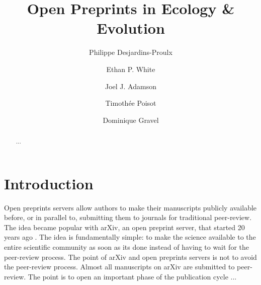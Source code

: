 \documentclass[letterpaper,twocolumn,superscriptaddress,showkeys]{revtex4}
\begin{document}
\title{Open Preprints in Ecology \& Evolution}

\author{Philippe Desjardins-Proulx}

\author{Ethan P. White}

\author{Joel J. Adamson}

\author{Timoth\'ee Poisot}

\author{Dominique Gravel}


\begin{abstract}

...
 
\end{abstract}

\maketitle

\section{Introduction}

Open preprints servers allow authors to make their manuscripts publicly
available before, or in parallel to, submitting them to journals for traditional
peer-review. The idea became popular with arXiv, an open preprint server, that
started 20 years ago \cite{gin11}. The idea is fundamentally simple: to make the
science available to the entire scientific community as soon as its done instead
of having to wait for the peer-review process. The point of arXiv and open
preprints servers is not to avoid the peer-review process. Almost all
manuscripts on arXiv are submitted to peer-review. The point is to open an
important phase of the publication cycle ...
\end{document}
